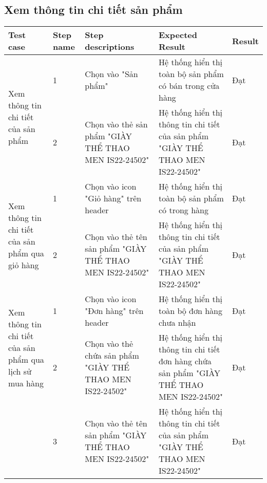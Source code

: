 \subsection{Xem thông tin chi tiết sản phẩm}
{
    \setlength\extrarowheight{6pt}
    \begin{longtable}{| p{2.5cm}| p{1cm}| p{5.5cm}| p{4.5cm} | p{1.5cm} |}
        \hline
        \textbf{Test case} & \textbf{Step name} & \textbf{Step descriptions} & \textbf{Expected Result} & \textbf{Result} \\
        \hline
        \multirow[t]{2}{2.5cm}{Xem thông tin chi tiết của sản phẩm} & 
        1 & 
        Chọn vào "Sản phẩm" & 
        Hệ thống hiển thị toàn bộ sản phẩm có bán trong cửa hàng & 
        Đạt \\
        \cline{2-5}
         & 2 & 
         Chọn vào thẻ sản phẩm "GIÀY THỂ THAO MEN IS22-24502" & 
         Hệ thống hiển thị thông tin chi tiết của sản phẩm "GIÀY THỂ THAO MEN IS22-24502" & 
         Đạt \\
         \hline
        \multirow[t]{2}{2.5cm}{Xem thông tin chi tiết của sản phẩm qua giỏ hàng} & 
        1 & 
        Chọn vào icon "Giỏ hàng" trên header & 
        Hệ thống hiển thị toàn bộ sản phẩm có trong hàng & 
        Đạt \\
        \cline{2-5}
         & 2 & 
         Chọn vào thẻ tên sản phẩm "GIÀY THỂ THAO MEN IS22-24502" & 
         Hệ thống hiển thị thông tin chi tiết của sản phẩm "GIÀY THỂ THAO MEN IS22-24502" & 
         Đạt \\
         \hline
        \multirow[t]{2}{2.5cm}{Xem thông tin chi tiết của sản phẩm qua lịch sử mua hàng} & 
        1 & 
        Chọn vào icon "Đơn hàng" trên header & 
        Hệ thống hiển thị toàn bộ đơn hàng chưa nhận & 
        Đạt \\
        \cline{2-5}
         & 2 & 
         Chọn vào thẻ chứa sản phẩm "GIÀY THỂ THAO MEN IS22-24502" & 
         Hệ thống hiển thị thông tin chi tiết đơn hàng chứa sản phẩm "GIÀY THỂ THAO MEN IS22-24502" & 
         Đạt \\
        \cline{2-5}
         & 3 & 
         Chọn vào thẻ tên sản phẩm "GIÀY THỂ THAO MEN IS22-24502" & 
         Hệ thống hiển thị thông tin chi tiết của sản phẩm "GIÀY THỂ THAO MEN IS22-24502" & 
         Đạt \\
         \hline
    \end{longtable}
}

